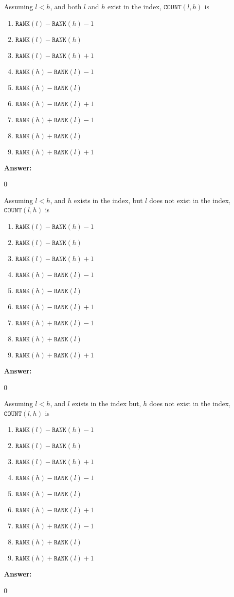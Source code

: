 \documentclass[12pt,twoside]{article}
\newcommand{\answer}{
 \par\medskip
 \textbf{Answer:}
}
\newcommand{\answerIe}{ \answer
0
}
\newcommand{\answerIf}{ \answer
0
}
\newcommand{\answerIg}{ \answer
0
}
\begin{document}
\begin{problems}
\begin{problemparts}
  \problempart {} Assuming $l < h$, and both $l$ and $h$ exist in the
  index, $\texttt{COUNT}(l, h)$ is
    \begin{enumerate}
      \item $\texttt{RANK}(l)-\texttt{RANK}(h)-1$
      \item $\texttt{RANK}(l)-\texttt{RANK}(h)$
      \item $\texttt{RANK}(l)-\texttt{RANK}(h)+1$
      \item $\texttt{RANK}(h)-\texttt{RANK}(l)-1$
      \item $\texttt{RANK}(h)-\texttt{RANK}(l)$
      \item $\texttt{RANK}(h)-\texttt{RANK}(l)+1$
      \item $\texttt{RANK}(h)+\texttt{RANK}(l)-1$
      \item $\texttt{RANK}(h)+\texttt{RANK}(l)$
      \item $\texttt{RANK}(h)+\texttt{RANK}(l)+1$
    \end{enumerate}
\answerIe

  \problempart {} Assuming $l < h$, and $h$ exists in the index, but $l$ does
  not exist in the index, $\texttt{COUNT}(l, h)$ is
  \begin{enumerate}
      \item $\texttt{RANK}(l)-\texttt{RANK}(h)-1$
      \item $\texttt{RANK}(l)-\texttt{RANK}(h)$
      \item $\texttt{RANK}(l)-\texttt{RANK}(h)+1$
      \item $\texttt{RANK}(h)-\texttt{RANK}(l)-1$
      \item $\texttt{RANK}(h)-\texttt{RANK}(l)$
      \item $\texttt{RANK}(h)-\texttt{RANK}(l)+1$
      \item $\texttt{RANK}(h)+\texttt{RANK}(l)-1$
      \item $\texttt{RANK}(h)+\texttt{RANK}(l)$
      \item $\texttt{RANK}(h)+\texttt{RANK}(l)+1$
    \end{enumerate}
\answerIf

  \problempart {} Assuming $l < h$, and $l$ exists in the index but, $h$ does
  not exist in the index, $\texttt{COUNT}(l, h)$ is
    \begin{enumerate}
      \item $\texttt{RANK}(l)-\texttt{RANK}(h)-1$
      \item $\texttt{RANK}(l)-\texttt{RANK}(h)$
      \item $\texttt{RANK}(l)-\texttt{RANK}(h)+1$
      \item $\texttt{RANK}(h)-\texttt{RANK}(l)-1$
      \item $\texttt{RANK}(h)-\texttt{RANK}(l)$
      \item $\texttt{RANK}(h)-\texttt{RANK}(l)+1$
      \item $\texttt{RANK}(h)+\texttt{RANK}(l)-1$
      \item $\texttt{RANK}(h)+\texttt{RANK}(l)$
      \item $\texttt{RANK}(h)+\texttt{RANK}(l)+1$
    \end{enumerate}
\answerIg


\end{problemparts}
\end{problems}
\end{document}
